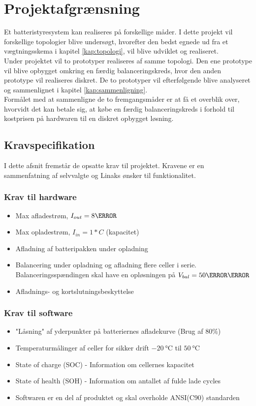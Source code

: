 \section{Projektafgrænsning}
Et batteristyresystem kan realiseres på forskellige måder. I dette projekt vil forskellige topologier blive undersøgt, hvorefter den bedst egnede ud fra et vægtningsskema i kapitel \ref{kap:topologi}, vil blive udviklet og realiseret. 
\\

Under projektet vil to prototyper realiseres af samme topologi. Den ene prototype vil blive opbygget omkring en færdig balanceringskreds, hvor den anden prototype vil realiseres diskret. De to prototyper vil efterfølgende blive analyseret og sammenlignet i kapitel \ref{kap:sammenligning}.
\\

Formålet med at sammenligne de to fremgangsmåder er at få et overblik over, hvorvidt det kan betale sig, at købe en færdig balanceringskreds i forhold til kostprisen på hardwaren til en diskret opbygget løsning.


\subsection{Kravspecifikation} \label{afs:kravspecifikation}
I dette afsnit fremstår de opsatte krav til projektet. Kravene er en sammenfatning af selvvalgte og Linaks ønsker til funktionalitet.
\subsubsection{Krav til hardware}
\begin{itemize}[noitemsep]
	\item Max afladestrøm, $I_{out} = 8\ampere$
	\item Max opladestrøm, $I_{in} = 1*C$ (kapacitet)
	\item Afladning af batteripakken under opladning
	\item Balancering under opladning og afladning flere celler i serie. Balanceringsspændingen skal have en opløsningen på  $V_{bal} = 50\milli\volt$
	\item Afladnings- og kortslutningsbeskyttelse
\end{itemize}
\subsubsection{Krav til software}
\begin{itemize}[noitemsep]
	\item "Låsning" af yderpunkter på batteriernes afladekurve (Brug af 80\%)
	\item Temperaturmålinger af celler for sikker drift $\SI{-20}{\celsius}$ til $\SI{50}{\celsius}$
	\item State of charge (SOC) - Information om cellernes kapacitet
	\item State of health (SOH) - Information om antallet af fulde lade cycles
	\item Softwaren er en del af produktet og skal overholde ANSI(C90) standarden
\end{itemize}


